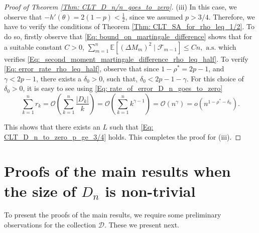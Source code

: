 \documentclass{article}
\numberwithin{equation}{section}
\newcommand{\FF}{\mbox{${\mathcal F}$}}
\newcommand{\OO}{\mbox{${\mathcal O}$}}
\newcommand{\DD}{\mbox{${\mathcal D}$}}
\newcommand{\1}{\mathbf{1}}
\newcommand{\0}{\mathbf{0}}
\newcommand{\E}{\mbox{${\mathbb E}$}}
\begin{document}
\begin{proof}[Proof of Theorem \ref{Thm: CLT_D_n/n_goes_to_zero}]
\noindent(iii) In this case, we observe that $-h'(\theta)= 2(1-p) < \frac{1}{2}$, since we assumed $p> 3/4$. Therefore, we have to verify the conditions of Theorem \ref{Thm: CLT_SA_for_rho_leq_1/2}. To do so, firstly observe that  \eqref{Eq: bound_on_martingale_difference} shows that for a suitable constant $C>0$, 
$\sum_{m=1}^n \E \left[(\Delta M_m)^2 \mid \FF_{m-1}\right]  \le C n , \text{ a.s.}$ which verifies 
\eqref{Eq:_second_moment_martingale_difference_rho_leq_half}. 
To verify 
\eqref{Eq: error_rate_rho_leq_half}, observe that since $1- \rho^*= 2p-1$, and $\gamma< 2p-1$, there exists a $\delta_0>0$, such that, $ \delta_0 < 2p-1-\gamma$. For this choice of $\delta_0>0$, it is easy to see using  \eqref{Eq: rate_of_error_D_n_goes_to_zero}
\begin{equation}
\sum_{k=1}^n r_k= \OO (\sum_{k=1}^n\frac{\lvert D_k \rvert }{k})=\OO (\sum_{k=1}^n k^{\gamma-1})=\OO(n^{\gamma}) = o(n^{1-\rho^*-\delta_0}).
\end{equation}

This shows that there exists an $L$ such that \eqref{Eq: CLT_D_n_to_zero_p_ge_3/4} holds. This completes the proof for (iii).
\end{proof}

\section{Proofs of the main results when the size of $ D_n$ is non-trivial} \label{sec: Proofs_D_n_non-trivial}
To present the proofs of the main results, we require some preliminary observations for the collection $\DD$. These we present next. 
\end{document}
